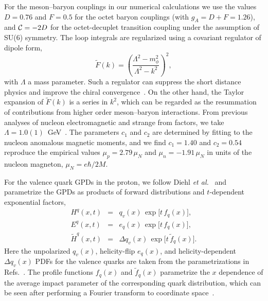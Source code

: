\documentclass[preprintnumbers,prd,superscriptaddress,preprint]{revtex4-1}
\begin{document}
For the meson--baryon couplings in our numerical calculations we use the values $D = 0.76$ and $F = 0.5$ for the octet baryon couplings (with $g_A = D+F = 1.26$), and ${\cal C} = -2D$ for the octet-decuplet transition coupling under the assumption of SU(6) symmetry.
The loop integrals are regularized using a covariant regulator of dipole form,
%
\begin{equation}
\widetilde{F}(k) = \left(\frac{\Lambda^2-m^2_\phi}{\Lambda^2-k^2}\right)^2,
\end{equation} 
%
with $\Lambda$ a mass parameter.
Such a regulator can suppress the short distance physics and improve the chiral convergence~\cite{Young:2002ib}. 
On the other hand, the Taylor expansion of $\widetilde{F}(k)$ is a series in $k^2$, which can be regarded as the resummation of contributions from higher order meson--baryon interactions.
%
From previous analyses of nucleon electromagnetic and strange from factors, we take $\Lambda=1.0(1)$~GeV~\cite{He:2017viu, He:2018eyz}.
The parameters $c_1$ and $c_2$ are determined by fitting to the nucleon anomalous magnetic moments, and we find $c_1=1.40$ and $c_2=0.54$ reproduce the empirical values $\mu_p=2.79\, \mu_N$ and $\mu_n=-1.91\, \mu_N$ in units of the nucleon magneton, $\mu_N=e\hbar/2M$.




For the valence quark GPDs in the proton, we follow Diehl {\it et al.}~\cite{Diehl:2004cx} and parametrize the GPDs as products of forward distributions and $t$-dependent exponential factors,
%
\begin{subequations}
\begin{eqnarray}
H^q(x,t) &=& q_v(x)\, \exp\big[t\,f_q(x)\big],
\\
E^q(x,t) &=& e_q(x)\, \exp\big[t\,f_q(x)\big],
\\
\widetilde{H}^q(x,t) &=& \Delta q_v(x)\, \exp\big[t\,\tilde{f}_q(x)\big].
\end{eqnarray}
\end{subequations}
%
Here the unpolarized $q_v(x)$, helicity-flip $e_q(x)$, and helicity-dependent $\Delta q_v(x)$ PDFs for the valence quarks are taken from the parametrizations in Refs.~\cite{Martin:1998sq, Diehl:2004cx,  Leader:2006xc}.
%
The profile functions $f_q(x)$ and $\tilde{f}_q(x)$ parametrize the $x$ dependence of the average impact parameter of the corresponding quark distribution, which can be seen after performing a Fourier transform to coordinate space~\cite{Diehl:2004cx}.
\end{document}
